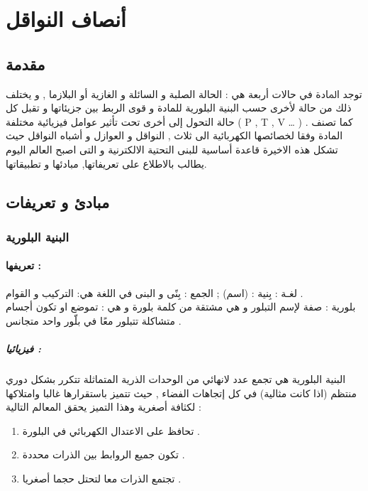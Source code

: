 
\chapter{ أنصاف النواقل }

\label{Chapter1}
\section*{مقدمة}

‫ﺗﻮﺟﺪ ‫اﳌﺎدة‬  ‬في  ‫ﺣﺎﻻت‬ ‫أرﺑﻌﺔ‬ هي : الحالة الصلبة و السائلة و الغازية أو البلازما , و يختلف ذلك من حالة لأخرى حسب البنية البلورية للمادة و قوى الربط بين جزيئاتها و تقبل كل حالة التحول  إلى أخرى تحت تأثير عوامل فيزيائية مختلفة ( P , T , V … ) .
كما تصنف المادة وفقا لخصائصها الكهربائية الى ثلاث , النواقل و العوازل و أشباه النواقل حيث تشكل هذه الاخيرة قاعدة أساسية للبنى التحتية الالكترنية و التى اصبح العالم اليوم يطالب بالاطلاع على  تعريفاتها, مبادئها و تطبيقاتها\cite{a2}.

\section{مبادئ و تعريفات}

\subsection{البنية البلورية }

\subsubsection{تعريفها :}
لغـة : بِنية : (اسم) ; الجمع : بِنًى و البنى في اللغة هي: التركيب و القوام . \\
بلورية : صفة لإسم التبلور و هي مشتقة من كلمة بلورة و هي : تموضع او تكون أجسام متشاكلة تتبلور معًا في بلّور واحد متجانس . \cite{a4}

\paragraph{فيزيائيا :}

البنیة البلوریة هي تجمع عدد لانهائي من الوحدات الذرية المتماثلة تتكرر بشكل دوري منتظم (اذا كانت مثالية) في كل إتجاهات الفضاء , حيث تتميز باستقرارها غالبا وامتلاكها لكثافة أصغرية وهذا التميز يحقق المعالم التالية :
\begin{enumerate}
	\item
	تحافظ على الاعتدال الكهربائي في البلورة .
	\item
	تكون جميع الروابط بين الذرات محددة .
	\item
	تجتمع الذرات معا لتحتل حجما أصغريا . 
\end{enumerate}

